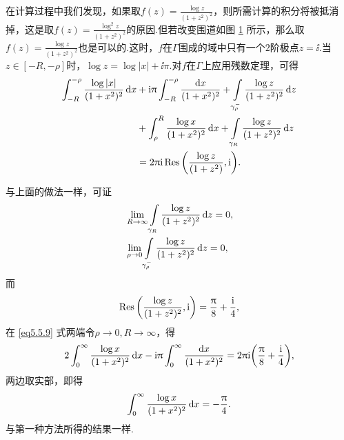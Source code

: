 \begin{solution}
  在计算过程中我们发现，如果取$f(z)=\frac{\log z}{(1+z^2)^2}$，则所需计算的积分将被抵消掉，这是取$f(z)=\frac{\log^2z}{(1+z^2)^2}$的原因.但若改变围道如图 \ref{fig5.5} 所示，那么取$f(z)=\frac{\log z}{(1+z^2)^2}$也是可以的.这时，$f$在$\Gamma$围成的域中只有一个$2$阶极点$z=\ii$.当$z\in[-R,-\rho]$时，$\log z=\log |x|+\ii\pi$.对$f$在$\Gamma$上应用残数定理，可得
  \begin{equation}\label{eq5.5.9}
    \begin{aligned}
      \int_{-R}^{-\rho}\frac{\log|x|}{(1+x^2)^2}\mathop{}\!\mathrm dx&+\mathrm i\uppi\int_{-R}^{-\rho}\frac{\mathop{}\!\mathrm dx}{(1+x^2)^2}
      + \int\limits_{\gamma_\rho^-}\frac{\log z}{(1+z^2)^2}\mathop{}\!\mathrm dz\\
      & + \int_\rho^R\frac{\log x}{(1+x^2)^2}\mathop{}\!\mathrm dx+\int\limits_{\gamma_R}\frac{\log z}{(1+z^2)^2}\mathop{}\!\mathrm dz\\
      & = 2\uppi\mathrm i \operatorname*{Res}\bigg(\frac{\log z}{(1+z^2)},\mathrm i\bigg).
    \end{aligned}
  \end{equation}
  \begin{figure}[!ht]
    \centering
    \caption{\label{fig5.5}}
  \end{figure}
  与上面的做法一样，可证
  \begin{align*}
    & \lim_{R\to\infty}\int\limits_{\gamma_R}\frac{\log z}{(1+z^2)^2}\mathop{}\!\mathrm dz=0,\\
    & \lim_{\rho\to0}\int\limits_{\gamma_\rho^-}\frac{\log z}{(1+z^2)^2}\mathop{}\!\mathrm dz=0,
  \end{align*}
  而
  \[
    \operatorname*{Res}\bigg(\frac{\log z}{(1+z^2)^2},\mathrm i\bigg) = \frac{\uppi}8+\frac{\mathrm i}4,
  \]
  在 \eqref{eq5.5.9} 式两端令$\rho\to0,R\to\infty$，得
  \[
    2\int_0^\infty\frac{\log x}{(1+x^2)^2}\mathop{}\!\mathrm dx-\mathrm i\uppi\int_0^\infty\frac{\mathop{}\!\mathrm dx}{(1+x^2)^2}
    = 2\uppi\mathrm i\bigg(\frac{\uppi}8+\frac{\mathrm i}4\bigg),
  \]
  两边取实部，即得
  \[
    \int_0^\infty\frac{\log x}{(1+x^2)^2}\mathop{}\!\mathrm dx = -\frac{\uppi}4.
  \]
  与第一种方法所得的结果一样.
\end{solution}

